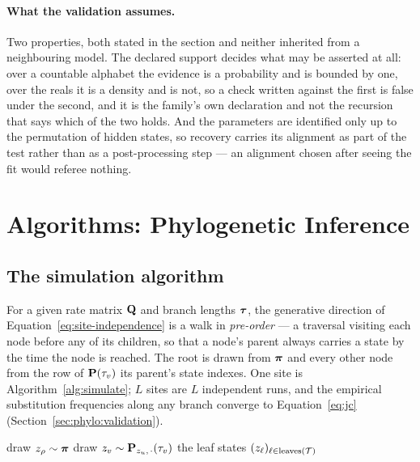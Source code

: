 \documentclass[11pt,a4paper]{article}
\begin{document}
\paragraph{What the validation assumes.}
Two properties, both stated in the section and neither inherited from a
neighbouring model. The declared support decides what may be asserted at
all: over a countable alphabet the evidence is a probability and is bounded
by one, over the reals it is a density and is not, so a check written
against the first is false under the second, and it is the family's own
declaration and not the recursion that says which of the two holds. And the
parameters are identified only up to the permutation
of hidden states, so recovery carries its alignment as part of the test
rather than as a post-processing step --- an alignment chosen after seeing
the fit would referee nothing.

\section{Algorithms: Phylogenetic Inference}
\label{sec:phylo:algorithms}

\subsection{The simulation algorithm}
For a given rate matrix $\mathbf{Q}$ and branch lengths $\boldsymbol{\tau}$, the generative
direction of Equation~\ref{eq:site-independence} is a walk in \emph{pre-order}
--- a traversal visiting each node before any of its children, so that a
node's parent always carries a state by the time the node is reached. The root
is drawn from $\boldsymbol{\pi}$ and every other node from the row of $\mathbf{P}(\tau_v)$ its
parent's state indexes. One site is Algorithm~\ref{alg:simulate}; $L$ sites are
$L$ independent runs, and the empirical substitution frequencies along any
branch converge to Equation~\ref{eq:jc}
(Section~\ref{sec:phylo:validation}).

\begin{algorithm}[htbp]
\caption{Forward simulation of one site under $(\tree, \branch, \Q)$}
\label{alg:simulate}
\begin{algorithmic}[1]
\State draw $z_{\rho} \sim \boldsymbol{\pi}$
  \State draw $z_v \sim \mathbf{P}_{z_u,\,\cdot}(\tau_v)$
\EndFor
\State \Return the leaf states $(z_\ell)_{\ell \in \mathrm{leaves}(\mathcal{T})}$
\end{algorithmic}
\end{algorithm}
\end{document}

